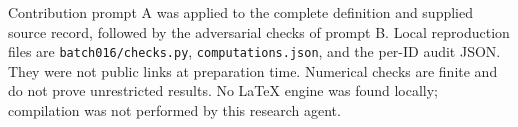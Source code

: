 \documentclass[11pt]{article}
\begin{document}
Contribution prompt A was applied to the complete definition and supplied source record, followed by the adversarial checks of prompt B. Local reproduction files are \texttt{batch016/checks.py}, \texttt{computations.json}, and the per-ID audit JSON. They were not public links at preparation time. Numerical checks are finite and do not prove unrestricted results. No LaTeX engine was found locally; compilation was not performed by this research agent.
\end{document}
